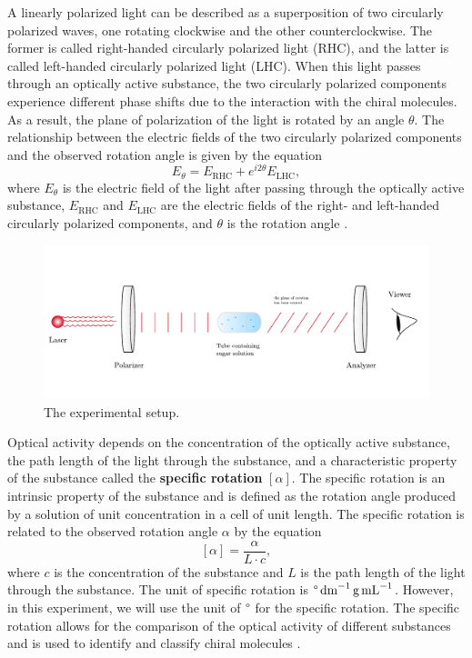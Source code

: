 \documentclass[10pt]{article}
\begin{document}
A linearly polarized light can be described as a superposition of two circularly polarized waves, one rotating clockwise and the other counterclockwise. The former is called right-handed circularly polarized light (RHC), and the latter is called left-handed circularly polarized light (LHC). When this light passes through an optically active substance, the two circularly polarized components experience different phase shifts due to the interaction with the chiral molecules. As a result, the plane of polarization of the light is rotated by an angle $\theta$. The relationship between the electric fields of the two circularly polarized components and the observed rotation angle is given by the equation
\begin{equation}\label{eq:1}
    E_{\theta} = E_{\text{RHC}} + e^{i2\theta}E_{\text{LHC}},
\end{equation}
where $E_{\theta}$ is the electric field of the light after passing through the optically active substance, $E_{\text{RHC}}$ and $E_{\text{LHC}}$ are the electric fields of the right- and left-handed circularly polarized components, and $\theta$ is the rotation angle \cite{Raymond_2013}.

\begin{figure}[h]
  \centering
  \includegraphics[scale=0.6]{figures/f1.pdf}
  \caption{The experimental setup.}
  \label{fig:f1}
\end{figure}

Optical activity depends on the concentration of the optically active substance, the path length of the light through the substance, and a characteristic property of the substance called the \textbf{specific rotation} $\left[\alpha\right]$. The specific rotation is an intrinsic property of the substance and is defined as the rotation angle produced by a solution of unit concentration in a cell of unit length. The specific rotation is related to the observed rotation angle $\alpha$ by the equation
\begin{equation}\label{eq:2}
 \left[ \alpha \right] = \frac{\alpha}{L \cdot c},
\end{equation}
where $c$ is the concentration of the substance and $L$ is the path length of the light through the substance. The unit of specific rotation is $\degree \, \text{dm}^{-1} \, \text{g} \, \text{mL}^{-1}$. However, in this experiment, we will use the unit of $\degree$ for the specific rotation. The specific rotation allows for the comparison of the optical activity of different substances and is used to identify and classify chiral molecules \cite{Bruice_2017}.
\end{document}
